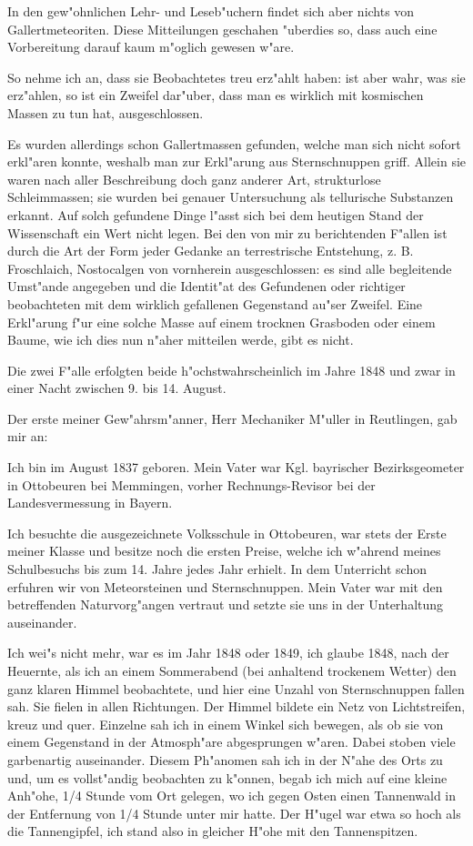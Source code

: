 \documentclass[a4paper, 11pt, oneside, german]{article}
\begin{document}
In den gew"ohnlichen Lehr- und Leseb"uchern findet sich aber nichts von Gallertmeteoriten. Diese Mitteilungen geschahen "uberdies so, dass auch eine Vorbereitung darauf kaum m"oglich gewesen w"are.

So nehme ich an, dass sie Beobachtetes treu erz"ahlt haben: ist aber wahr, was sie erz"ahlen, so ist ein Zweifel dar"uber, dass man es wirklich mit kosmischen Massen zu tun hat, ausgeschlossen.

Es wurden allerdings schon Gallertmassen gefunden, welche man sich nicht sofort erkl"aren konnte, weshalb man zur Erkl"arung aus Sternschnuppen griff. Allein sie waren nach aller Beschreibung doch ganz anderer Art, strukturlose Schleimmassen; sie wurden bei genauer Untersuchung als tellurische Substanzen erkannt. Auf solch gefundene Dinge l"asst sich bei dem heutigen Stand der Wissenschaft ein Wert nicht legen. Bei den von mir zu berichtenden F"allen ist durch die Art der Form jeder Gedanke an terrestrische Entstehung, z. B. Froschlaich, Nostocalgen von vornherein ausgeschlossen: es sind alle begleitende Umst"ande angegeben und die Identit"at des Gefundenen oder richtiger beobachteten mit dem wirklich gefallenen Gegenstand au"ser Zweifel. Eine Erkl"arung f"ur eine solche Masse auf einem trocknen Grasboden oder einem Baume, wie ich dies nun n"aher mitteilen werde, gibt es nicht.

Die zwei F"alle erfolgten beide h"ochstwahrscheinlich im Jahre 1848 und zwar in einer Nacht zwischen 9. bis 14. August.

Der erste meiner Gew"ahrsm"anner, Herr Mechaniker M"uller in Reutlingen, gab mir an:

Ich bin im August 1837 geboren. Mein Vater war Kgl. bayrischer Bezirksgeometer in Ottobeuren bei Memmingen, vorher Rechnungs-Revisor bei der Landesvermessung in Bayern.

Ich besuchte die ausgezeichnete Volksschule in Ottobeuren, war stets der Erste meiner Klasse und besitze noch die ersten Preise, welche ich w"ahrend meines Schulbesuchs bis zum 14. Jahre jedes Jahr erhielt. In dem Unterricht schon erfuhren wir von Meteorsteinen und Sternschnuppen. Mein Vater war mit den betreffenden Naturvorg"angen vertraut und setzte sie uns in der Unterhaltung auseinander.

Ich wei"s nicht mehr, war es im Jahr 1848 oder 1849, ich glaube 1848, nach der Heuernte, als ich an einem Sommerabend (bei anhaltend trockenem Wetter) den ganz klaren Himmel beobachtete, und hier eine Unzahl von Sternschnuppen fallen sah. Sie fielen in allen Richtungen. Der Himmel bildete ein Netz von Lichtstreifen, kreuz und quer. Einzelne sah ich in einem Winkel sich bewegen, als ob sie von einem Gegenstand in der Atmosph"are abgesprungen w"aren. Dabei stoben viele garbenartig auseinander. Diesem Ph"anomen sah ich in der N"ahe des Orts zu und, um es vollst"andig beobachten zu k"onnen, begab ich mich auf eine kleine Anh"ohe, 1/4 Stunde vom Ort gelegen, wo ich gegen Osten einen Tannenwald in der Entfernung von 1/4 Stunde unter mir hatte. Der H"ugel war etwa so hoch als die Tannengipfel, ich stand also in gleicher H"ohe mit den Tannenspitzen.
\end{document}
